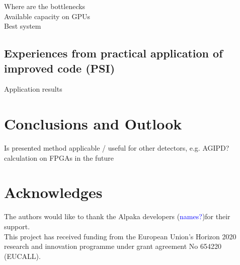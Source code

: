 \documentclass[a4paper]{article}
\begin{document}
Where are the bottlenecks\\

Available capacity on GPUs\\

Best system

\subsection{Experiences from practical application of improved code (PSI)}
Application results

\section{Conclusions and Outlook}
\label{sec:conclusions}
Is presented method applicable / useful for other detectors, e.g. AGIPD? \\

calculation on FPGAs in the future


\section{Acknowledges}
The authors would like to thank the Alpaka developers (\textcolor{blue}{names?})for their support.\\

This project has received funding from the European Union's Horizon 2020 research and innovation programme under grant agreement No 654220 (EUCALL).

\newpage

\begin{sloppypar}
\printbibliography
\end{sloppypar}
\end{document}
